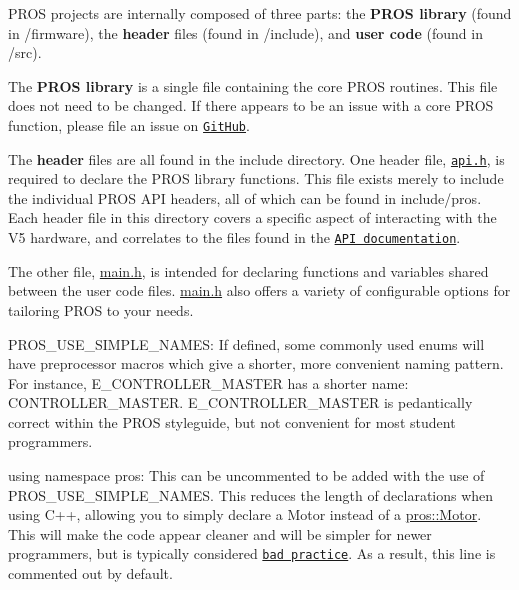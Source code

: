 P\+R\+OS projects are internally composed of three parts\+: the {\bfseries P\+R\+OS library} (found in {\ttfamily /firmware}), the {\bfseries header} files (found in {\ttfamily /include}), and {\bfseries user code} (found in {\ttfamily /src}).

The {\bfseries P\+R\+OS library} is a single file containing the core P\+R\+OS routines. This file does not need to be changed. If there appears to be an issue with a core P\+R\+OS function, please file an issue on \href{https://github.com/purduesigbots/pros/issues}{\tt Git\+Hub}.

The {\bfseries header} files are all found in the {\ttfamily include} directory. One header file, \href{../../api/index.html}{\tt api.\+h}, is required to declare the P\+R\+OS library functions. This file exists merely to include the individual P\+R\+OS A\+PI headers, all of which can be found in {\ttfamily include/pros}. Each header file in this directory covers a specific aspect of interacting with the V5 hardware, and correlates to the files found in the \href{../../api/index.html}{\tt A\+PI documentation}.

The other file, {\ttfamily \hyperlink{main_8h}{main.\+h}}, is intended for declaring functions and variables shared between the user code files. {\ttfamily \hyperlink{main_8h}{main.\+h}} also offers a variety of configurable options for tailoring P\+R\+OS to your needs.


\begin{DoxyItemize}
\item {\ttfamily P\+R\+O\+S\+\_\+\+U\+S\+E\+\_\+\+S\+I\+M\+P\+L\+E\+\_\+\+N\+A\+M\+ES}\+: If defined, some commonly used enums will have preprocessor macros which give a shorter, more convenient naming pattern. For instance, E\+\_\+\+C\+O\+N\+T\+R\+O\+L\+L\+E\+R\+\_\+\+M\+A\+S\+T\+ER has a shorter name\+: {\ttfamily C\+O\+N\+T\+R\+O\+L\+L\+E\+R\+\_\+\+M\+A\+S\+T\+ER}. {\ttfamily E\+\_\+\+C\+O\+N\+T\+R\+O\+L\+L\+E\+R\+\_\+\+M\+A\+S\+T\+ER} is pedantically correct within the P\+R\+OS styleguide, but not convenient for most student programmers.
\item {\ttfamily using namespace pros}\+: This can be uncommented to be added with the use of {\ttfamily P\+R\+O\+S\+\_\+\+U\+S\+E\+\_\+\+S\+I\+M\+P\+L\+E\+\_\+\+N\+A\+M\+ES}. This reduces the length of declarations when using C++, allowing you to simply declare a {\ttfamily Motor} instead of a {\ttfamily \hyperlink{classpros_1_1Motor}{pros\+::\+Motor}}. This will make the code appear cleaner and will be simpler for newer programmers, but is typically considered \href{https://msdn.microsoft.com/en-us/library/5cb46ksf.aspx}{\tt bad practice}. As a result, this line is commented out by default.
\end{DoxyItemize}

